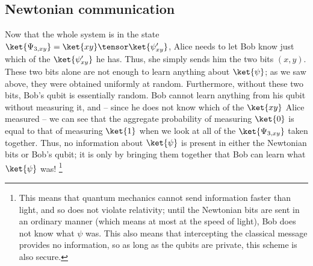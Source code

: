 \subsection{Newtonian communication}\label{sec:newtonian-communication}
Now that the whole system is in the state $\ket{\Psi_{3,xy}} =
\ket{xy}\tensor\ket{\psi'_{xy}}$, Alice needs to let Bob know just which of the
$\ket{\psi'_{xy}}$ he has.  Thus, she simply sends him the two bits $(x,y)$.
These two bits alone are not enough to learn anything about $\ket{\psi}$; as we
saw above, they were obtained uniformly at random. Furthermore, without
these two bits, Bob's qubit is essentially random.
Bob cannot learn anything from his
qubit without measuring it, and -- since he does not know which of the
$\ket{xy}$ Alice measured -- we can see that the aggregate probability of
measuring $\ket{0}$ is equal to that of measuring $\ket{1}$ when we look at all
of the $\ket{\Psi_{3,xy}}$ taken together.  Thus, no information about
$\ket{\psi}$ is present in either the Newtonian bits or Bob's qubit; it is only
by bringing them together that Bob can learn what $\ket{\psi}$ was!%
\footnote{This means that quantum mechanics cannot send information faster than
  light, and so does not violate relativity; until the Newtonian bits are sent
  in an ordinary manner (which means at most at the speed of light), Bob does
  not know what $\psi$ was.  This also means that intercepting the classical
  message provides no information, so as long as the qubits are private, this
  scheme is also secure.}

